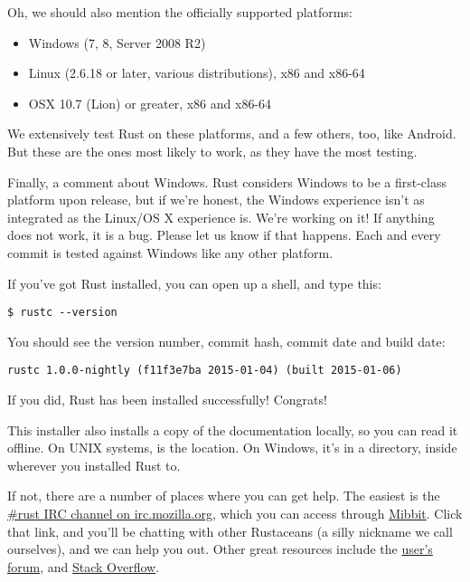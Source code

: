 \blank

Oh, we should also mention the officially supported platforms:

\begin{itemize}
  \item{Windows (7, 8, Server 2008 R2)}
  \item{Linux (2.6.18 or later, various distributions), x86 and x86-64}
  \item{OSX 10.7 (Lion) or greater, x86 and x86-64}
\end{itemize}

We extensively test Rust on these platforms, and a few others, too, like Android. But these are the ones most likely 
to work, as they have the most testing.

\blank

Finally, a comment about Windows. Rust considers Windows to be a first-class platform upon release, but if we're honest, 
the Windows experience isn't as integrated as the Linux/OS X experience is. We're working on it! If anything does not work, 
it is a bug. Please let us know if that happens. Each and every commit is tested against Windows like any other platform.

\blank

If you've got Rust installed, you can open up a shell, and type this:

\begin{verbatim}
$ rustc --version
\end{verbatim}

You should see the version number, commit hash, commit date and build date:

\begin{verbatim}
rustc 1.0.0-nightly (f11f3e7ba 2015-01-04) (built 2015-01-06)
\end{verbatim}

If you did, Rust has been installed successfully! Congrats!

\blank

This installer also installs a copy of the documentation locally, so you can read it offline. On UNIX systems, 
 is the location. On Windows, it's in a  directory, inside wherever you 
installed Rust to.

\blank

If not, there are a number of places where you can get help. The easiest is the 
\href{irc://irc.mozilla.org/\#rust}{\#rust IRC channel on irc.mozilla.org}, which you can access through 
\href{http://chat.mibbit.com/?server=irc.mozilla.org\&channel=\%23rust}{Mibbit}. Click that link, and you'll be chatting with 
other Rustaceans (a silly nickname we call ourselves), and we can help you out. Other great resources include the 
\href{https://users.rust-lang.org/}{user's forum}, and \href{http://stackoverflow.com/questions/tagged/rust}{Stack Overflow}.


